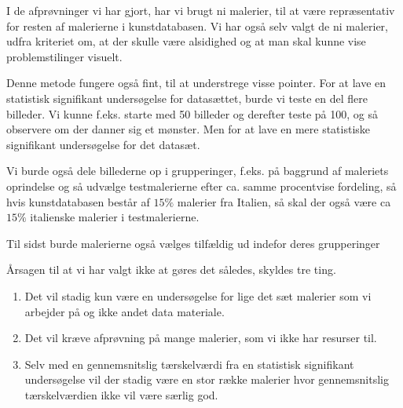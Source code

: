 I de afprøvninger vi har gjort, har vi brugt ni malerier, til at være
repræsentativ for resten af malerierne i kunstdatabasen. Vi har også selv
valgt de ni malerier, udfra kriteriet om, at der skulle være alsidighed og at
man skal kunne vise problemstilinger visuelt.

Denne metode fungere også fint, til at understrege visse pointer.
For at lave en statistisk signifikant undersøgelse for datasættet, burde
vi teste en del flere billeder. Vi kunne f.eks. starte med 50 billeder
og derefter teste på 100, og så observere om der danner sig et mønster.
Men for at lave en mere statistiske signifikant undersøgelse for det
datasæt. 

Vi burde også dele billederne op i grupperinger, f.eks. på baggrund af maleriets
oprindelse og så udvælge testmalerierne efter ca. samme procentvise
fordeling, så hvis kunstdatabasen består af $15 \%$ malerier fra
Italien, så skal der også være ca $15 \%$ italienske malerier i testmalerierne.

Til sidst burde malerierne også vælges tilfældig ud indefor deres
grupperinger

Årsagen til at vi har valgt ikke at gøres det således, skyldes tre ting.

\begin{enumerate}
	\item Det vil stadig kun være en undersøgelse for lige det sæt
	malerier som vi arbejder på og ikke andet data materiale.
	\item Det vil kræve afprøvning på mange malerier, som vi ikke har
	resurser til. 
	\item Selv med en gennemsnitslig tærskelværdi fra en statistisk
	signifikant undersøgelse vil der stadig være en stor række malerier
	hvor gennemsnitslig tærskelværdien ikke vil være særlig god. 
\end{enumerate}
